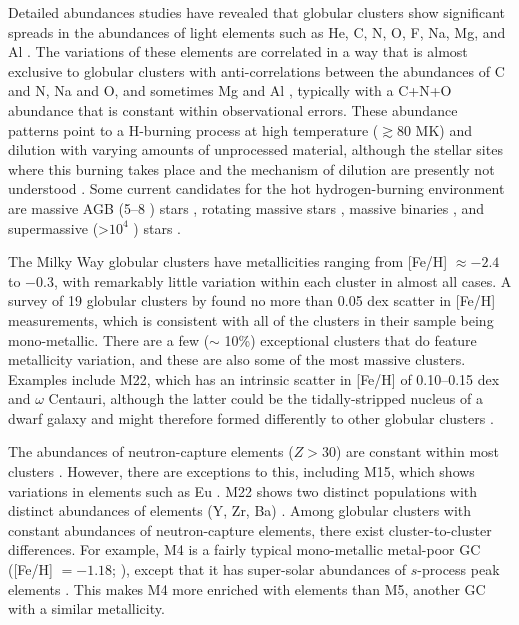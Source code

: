 Detailed abundances studies have revealed that globular clusters show significant spreads in the abundances of light elements such as He, C, N, O, F, Na, Mg, and Al \citep{Cohen:1978gq,Peterson:1980ca,Gratton:2004dy}. The variations of these elements are correlated in a way that is almost exclusive to globular clusters \citep[i.e., it is rarely seen in field stars and open clusters, as shown by][]{Kraft:1982es,Shetrone:1996hp,Kraft:1997hp,Gratton:2000wg,DeSilva:2009ki} with anti-correlations between the abundances of C and N, Na and O, and sometimes Mg and Al \citep{Shetrone:1996hp}, typically with a C+N+O abundance that is constant within observational errors. These abundance patterns point to a H-burning process at high temperature ($\gtrsim80$ MK) and dilution with varying amounts of unprocessed material, although the stellar sites where this burning takes place and the mechanism of dilution are presently not understood \citep{Prantzos:2007bs}. Some current candidates for the hot hydrogen-burning environment are massive AGB (5--8 \Msun) stars \citep{Cottrell:1981ha,Ventura:2001ek}, rotating massive stars \citep{Prantzos:2006cv,Decressin:2007bf}, massive binaries \citep{deMink:2009kv,Bastian:2013fd}, and supermassive (>$10^4$ \Msun) stars \citep{Denissenkov:2014bc,Denissenkov:2015dw}.

The Milky Way globular clusters have metallicities ranging from [Fe/H] $\approx-2.4$ to $-0.3$, with remarkably little variation within each cluster in almost all cases. A survey of 19 globular clusters by \citet{Carretta:2009di} found no more than 0.05 dex scatter in [Fe/H] measurements, which is consistent with all of the clusters in their sample being mono-metallic.  There are a few ($\sim$ 10\%) exceptional clusters that do feature metallicity variation, and these are also some of the most massive clusters. Examples include M22, which has an intrinsic scatter in [Fe/H] of 0.10--0.15 dex \citep{Marino:2009je,DaCosta:2009jl} and $\omega$ Centauri, although the latter could be the tidally-stripped nucleus of a dwarf galaxy \citep{Freeman:1993vl,Bekki:2003dv} and might therefore formed differently to other globular clusters \citep[see the discussion in][]{Gratton:2004dy}.

The abundances of neutron-capture elements ($Z > 30$) are constant within most clusters \citep{Gratton:2004dy,Yong:2006ia,Yong:2008in,DOrazi:2010fs}. However, there are exceptions to this, including M15, which shows variations in \rprocess elements such as Eu \citep{Sneden:2000ba}. M22 shows two distinct populations with distinct abundances of \sprocess elements (Y, Zr, Ba) \citep{Marino:2009je,Villanova:2010ci}. Among globular clusters with constant abundances of neutron-capture elements, there exist cluster-to-cluster differences. For example, M4 is a fairly typical mono-metallic metal-poor GC ([Fe/H] $=-1.18$; \citealt{Carretta:2009di}), except that it has super-solar abundances of $s$-process peak elements \citep[e.g., Rb, Y, Zr, La, Ba, Pb;][]{Brown:1992dw,Ivans:1999hf}. This makes M4 more enriched with \sprocess elements than M5, another GC with a similar metallicity.

